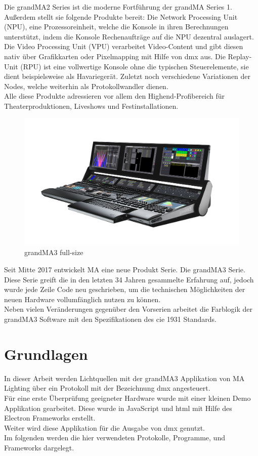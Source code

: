 \documentclass[11pt]{scrartcl}
\begin{document}
\noindent
Die grandMA2 Series ist die moderne Fortführung der grandMA Series 1. Außerdem stellt sie
folgende Produkte bereit: Die Network Processing Unit (NPU), eine Prozessoreinheit, welche die
Konsole in ihren Berechnungen unterstützt, indem die Konsole Rechenaufträge auf die NPU dezentral
auslagert. Die Video Processing Unit (VPU) verarbeitet Video-Content und gibt diesen nativ über
Grafikkarten oder Pixelmapping mit Hilfe von \ac{dmx} aus. Die Replay-Unit (RPU) ist eine vollwertige
Konsole ohne die typischen Steuerelemente, sie dient beispielsweise als Havariegerät. Zuletzt noch
verschiedene Variationen der Nodes, welche weiterhin als Protokollwandler dienen.\\
Alle diese Produkte adressieren vor allem den Highend-Profibereich für Theaterproduktionen,
Liveshows und Festinstallationen.\\
\begin{figure}[H]
    \includegraphics[width=\textwidth]{images/grandMA3-full-size.png}
    \caption{grandMA3 full-size}\label{fig:gma3}
\end{figure}
\noindent
Seit Mitte 2017 entwickelt MA eine neue Produkt Serie. Die grandMA3 Serie. Diese Serie greift die
in den letzten 34 Jahren gesammelte Erfahrung auf, jedoch wurde jede Zeile Code neu geschrieben,
um die technischen Möglichkeiten der neuen Hardware vollumfänglich nutzen zu können.\\
Neben vielen Veränderungen gegenüber den Vorserien arbeitet die Farblogik der grandMA3 Software
mit den Spezifikationen des \ac{cie} 1931 Standards.
\clearpage

\section{Grundlagen}
In dieser Arbeit werden Lichtquellen mit der grandMA3 Applikation von MA Lighting über ein Protokoll
mit der Bezeichnung \ac{dmx} angesteuert.\\
Für eine erste Überprüfung geeigneter Hardware wurde mit einer kleinen Demo Applikation gearbeitet. Diese wurde
in JavaScript und \ac{html} mit Hilfe des Electron Frameworks erstellt.\\
Weiter wird diese Applikation für die Ausgabe von \ac{dmx} genutzt.\\
Im folgenden werden die hier verwendeten Protokolle, Programme, und Frameworks dargelegt.
\end{document}
